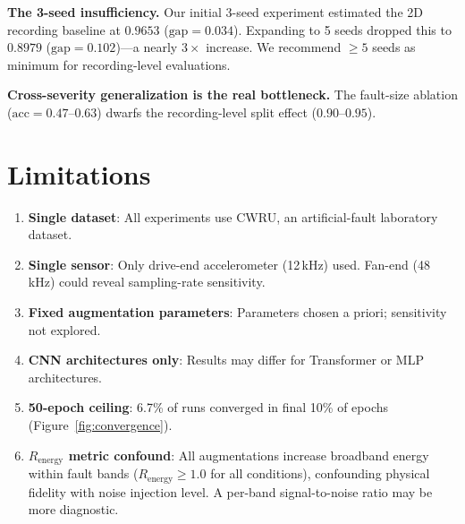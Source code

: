 ﻿\documentclass[11pt,a4paper]{article}
\begin{document}
\textbf{The 3-seed insufficiency.} Our initial 3-seed experiment estimated the 2D recording baseline at $0.9653$ ($\text{gap}=0.034$). Expanding to 5 seeds dropped this to $0.8979$ ($\text{gap}=0.102$)---a nearly $3\times$ increase. We recommend $\geq 5$ seeds as minimum for recording-level evaluations.

\textbf{Cross-severity generalization is the real bottleneck.} The fault-size ablation ($\text{acc}=0.47$--$0.63$) dwarfs the recording-level split effect ($0.90$--$0.95$).

\section{Limitations}

\begin{enumerate}[nosep]
    \item \textbf{Single dataset}: All experiments use CWRU, an artificial-fault laboratory dataset.
    \item \textbf{Single sensor}: Only drive-end accelerometer (12\,kHz) used. Fan-end (48\,kHz) could reveal sampling-rate sensitivity.
    \item \textbf{Fixed augmentation parameters}: Parameters chosen a priori; sensitivity not explored.
    \item \textbf{CNN architectures only}: Results may differ for Transformer or MLP architectures.
    \item \textbf{50-epoch ceiling}: 6.7\% of runs converged in final 10\% of epochs (Figure~\ref{fig:convergence}).
    \item \textbf{$R_{\text{energy}}$ metric confound}: All augmentations increase broadband energy within fault bands ($R_{\text{energy}}\geq1.0$ for all conditions), confounding physical fidelity with noise injection level. A per-band signal-to-noise ratio may be more diagnostic.
\end{enumerate}

\end{document}
